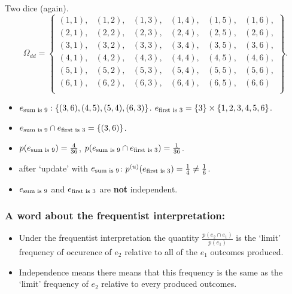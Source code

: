 \documentclass{beamer}
\begin{document}
\begin{frame}
  \begin{exampleblock}{Two dice (again).}
    \[ \Omega_{dd} = \left\{ \begin{array}{llllll}
      (1, 1), &(1, 2), &(1, 3), &(1, 4), &(1, 5), &(1, 6),\\
      (2, 1), &(2, 2), &(2, 3), &(2, 4), &(2, 5), &(2, 6),\\
      (3, 1), &(3, 2), &(3, 3), &(3, 4), &(3, 5), &(3, 6),\\
      (4, 1), &(4, 2), &(4, 3), &(4, 4), &(4, 5), &(4, 6),\\
      (5, 1), &(5, 2), &(5, 3), &(5, 4), &(5, 5), &(5, 6),\\
      (6, 1), &(6, 2), &(6, 3), &(6, 4), &(6, 5), &(6, 6)\\
      \end{array}
      \right \}.\]
  \end{exampleblock}

  \begin{itemize}
  \item $e_{\textnormal{sum is 9}}: \{(3,6), (4,5),(5,4),(6,3)\}$. $e_{\textnormal{first is 3}} = \{3\} \times \{1,2,3,4,5,6\}$.
  \item $e_{\textnormal{sum is 9}} \cap e_{\textnormal{first is 3}} = \{(3,6)\}$.
  \item $p(e_{\textnormal{sum is 9}}) = \frac{4}{36}$, $p(e_{\textnormal{sum is 9}} \cap e_{\textnormal{first is 3}}) = \frac{1}{36}$.
  \item after `update' with $e_{\textnormal{sum is 9}}$: $p^{(u)}(e_{\textnormal{first is 3}}) = \frac{1}{4} \neq \frac{1}{6}$.
  \item $e_{\textnormal{sum is 9}}$ and $e_{\textnormal{first is 3}}$ are \textbf{not} independent.
  \end{itemize}
  
\end{frame}

\begin{frame}
  \frametitle{A word about the frequentist interpretation:}
  \begin{itemize}
  \item Under the frequentist interpretation the quantity $\frac{p(e_2 \cap e_1)}{p(e_1)}$ is the `limit' frequency of occurence of $e_2$ relative to all of the $e_1$ outcomes produced.
  \item Independence means there means that this frequency is the same as the `limit' frequency of $e_2$ relative to every produced outcomes.
  \end{itemize}
\end{frame}
\end{document}
